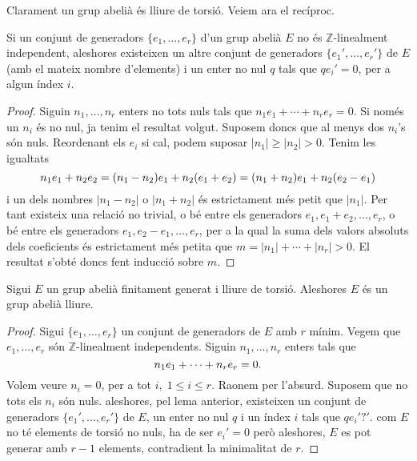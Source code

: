 \documentclass[../main.tex]{subfiles}
\begin{document}
Clarament un grup abelià és lliure de torsió. Veiem ara el recíproc.

\begin{lema}
Si un conjunt de generadors $\{e_1,\ldots,e_r\}$ d'un grup abelià $E$ no és $\mathbb{Z}$-linealment independent, aleshores existeixen un altre conjunt de generadors $\{e_1',\ldots,e_r'\}$ de $E$ (amb el mateix nombre d'elements) i un enter no nul $q$ tals que $qe_i' = 0$, per a algun índex $i$.
\end{lema}
\begin{proof}
Siguin $n_1,\ldots,n_r$ enters no tots nuls tals que $n_1e_1+\cdots+n_re_r = 0$. Si només un $n_i$ és no nul, ja tenim el resultat volgut. Suposem doncs que al menys dos $n_i$'s són nuls. Reordenant els $e_i$ si cal, podem suposar $|n_1|\geq |n_2|>0$. Tenim les igualtats
\begin{equation}
    \notag
    n_1e_1+n_2e_2 = (n_1-n_2)e_1+n_2(e_1+e_2) = (n_1+n_2)e_1+n_2(e_2-e_1)
\end{equation}
i un dels nombres $|n_1-n_2|$ o $|n_1+n_2|$ és estrictament més petit que $|n_1|$. Per tant existeix una relació no trivial, o bé entre els generadors $e_1,e_1+e_2,\ldots,e_r$, o bé entre els generadors $e_1,e_2-e_1,\ldots,e_r$, per a la qual la suma dels valors absoluts dels coeficients és estrictament més petita que $m = |n_1|+\cdots+|n_r|>0$. El resultat s'obté doncs fent inducció sobre $m$.
\end{proof}

\begin{prop}
Sigui $E$ un grup abelià finitament generat i lliure de torsió. Aleshores $E$ és un grup abelià lliure.
\end{prop}
\begin{proof}
Sigui $\{e_1,\ldots,e_r\}$ un conjunt de generadors de $E$ amb $r$ mínim. Vegem que $e_1,\ldots,e_r$ són $\mathbb{Z}$-linealment independents. Siguin $n_1,\ldots,n_r$ enters tals que
\begin{equation}
    \notag
    n_1e_1+\cdots+n_re_r = 0.
\end{equation}
Volem veure $n_i = 0$, per a tot $i,\;1\leq i \leq r$. Raonem per l'absurd. Suposem que no tots els $n_i$ són nuls. aleshores, pel lema anterior, existeixen un conjunt de generadors $\{e_1',\ldots,e_r'\}$ de $E$, un enter no nul $q$ i un índex $i$ tals que $qe_i' ? '$. com $E$ no té elements de torsió no nuls, ha de ser $e_i' = 0$ però aleshores, $E$ es pot generar amb $r-1$ elements, contradient la minimalitat de $r$.
\end{proof}
\end{document}

